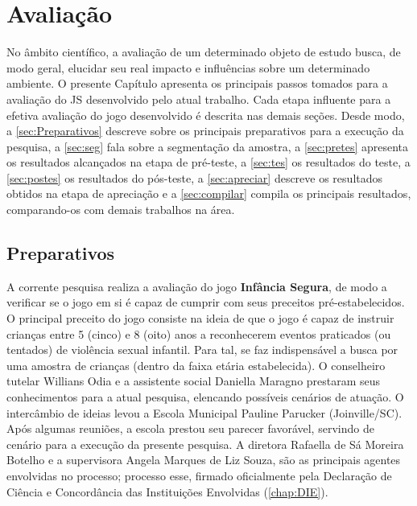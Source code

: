\chapter{Avaliação}\label{ch:Avaliacao}

No âmbito científico, a avaliação de um determinado objeto de estudo busca, de modo geral, elucidar seu real impacto e influências sobre um determinado ambiente. O presente Capítulo apresenta os principais passos tomados para a avaliação do \acf{JS} desenvolvido pelo atual trabalho. Cada etapa influente para a efetiva avaliação do jogo desenvolvido é descrita nas demais seções. Desde modo, a \autoref{sec:Preparativos} descreve sobre os principais preparativos para a execução da pesquisa, a \autoref{sec:seg} fala sobre a segmentação da amostra, a \autoref{sec:pretes} apresenta os resultados alcançados na etapa de pré-teste, a \autoref{sec:tes} os resultados do teste, a \autoref{sec:postes} os resultados do pós-teste, a \autoref{sec:apreciar} descreve os resultados obtidos na etapa de apreciação e a \autoref{sec:compilar} compila os principais resultados, comparando-os com demais trabalhos na área. 

\section{Preparativos}\label{sec:Preparativos}

A corrente pesquisa realiza a avaliação do jogo \textbf{Infância Segura}, de modo a verificar se o jogo em si é capaz de cumprir com seus preceitos pré-estabelecidos. O principal preceito do jogo consiste na ideia de que o jogo é capaz de instruir crianças entre 5 (cinco) e 8 (oito) anos a reconhecerem eventos praticados (ou tentados) de violência sexual infantil. Para tal, se faz indispensável a busca por uma amostra de crianças (dentro da faixa etária estabelecida). O conselheiro tutelar Willians Odia e a assistente social Daniella Maragno prestaram seus conhecimentos para a atual pesquisa, elencando possíveis cenários de atuação. O intercâmbio de ideias levou a Escola Municipal Pauline Parucker (Joinville/\ac{SC}). Após algumas reuniões, a escola prestou seu parecer favorável, servindo de cenário para a execução da presente pesquisa. A diretora Rafaella de Sá Moreira Botelho e a supervisora Angela Marques de Liz Souza, são as principais agentes envolvidas no processo; processo esse, firmado oficialmente pela Declaração de Ciência e Concordância das Instituições Envolvidas (\autoref{chap:DIE}). 

